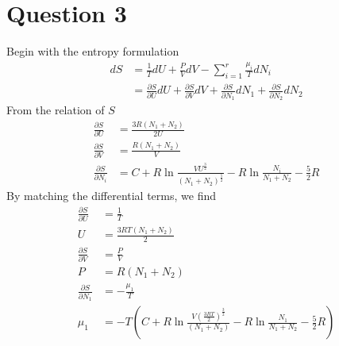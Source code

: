 \documentclass{article}
\numberwithin{equation}{section}
\begin{document}
\section*{Question 3}

Begin with the entropy formulation
\begin{align*}
dS&=\frac{1}{T}dU +\frac{P}{V}dV-\sum_{i=1}^r\frac{\mu_i}{T}dN_i\\
&=\frac{\partial S}{\partial U}dU+\frac{\partial S}{\partial V}dV+\frac{\partial S}{\partial N_1}dN_1+\frac{\partial S}{\partial N_2}dN_2
\end{align*}
From the relation of $S$
\begin{align*}
\frac{\partial S}{\partial U}&=\frac{3R(N_1+N_2)}{2U}\\
\frac{\partial S}{\partial V}&=\frac{R(N_1+N_2)}{V}\\
\frac{\partial S}{\partial N_i}&=C+R\ln\frac{VU^{\frac{3}{2}}}{(N_1+N_2)^{\frac{5}{2}}}-R\ln\frac{N_i}{N_1+N_2}-\frac{5}{2}R
\end{align*}
By matching the differential terms, we find
\begin{align*}
\frac{\partial S}{\partial U}&=\frac{1}{T}\\
U&=\frac{3RT(N_1+N_2)}{2}\\
\frac{\partial S}{\partial V}&=\frac{P}{V}\\
P&={R(N_1+N_2)}\\
\frac{\partial S}{\partial N_1}&=-\frac{\mu_1}{T}\\
\mu_1&=-T(C+R\ln\frac{V(\frac{3RT}{2})^{\frac{3}{2}}}{(N_1+N_2)}-R\ln\frac{N_1}{N_1+N_2}-\frac{5}{2}R)
\end{align*}
\end{document}
